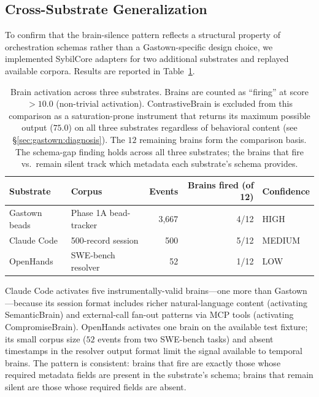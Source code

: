 \subsection{Cross-Substrate Generalization}
\label{sec:gastown:crosssubstrate}

To confirm that the brain-silence pattern reflects a structural property
of orchestration schemas rather than a Gastown-specific design choice, we
implemented SybilCore adapters for two additional substrates and replayed
available corpora. Results are reported in Table~\ref{tab:cross_substrate}.

\begin{table}[h!]
\centering
\caption{Brain activation across three substrates. Brains are counted as
``firing'' at score $> 10.0$ (non-trivial activation). ContrastiveBrain
is excluded from this comparison as a saturation-prone instrument that
returns its maximum possible output ($75.0$) on all three substrates
regardless of behavioral content (see \S\ref{sec:gastown:diagnosis}).
The $12$ remaining brains form the comparison basis. The schema-gap
finding holds across all three substrates; the brains that fire vs.\
remain silent track which metadata each substrate's schema provides.}
\label{tab:cross_substrate}
\small
\begin{tabular}{llrrl}
\toprule
\textbf{Substrate} & \textbf{Corpus} & \textbf{Events} &
\textbf{Brains fired (of 12)} & \textbf{Confidence} \\
\midrule
Gastown beads & Phase 1A bead-tracker & 3,667 & 4/12 & HIGH \\
Claude Code & 500-record session & 500 & 5/12 & MEDIUM \\
OpenHands & SWE-bench resolver & 52 & 1/12 & LOW \\
\bottomrule
\end{tabular}
\end{table}

Claude Code activates five instrumentally-valid brains---one more than
Gastown---because its session format includes richer natural-language
content (activating SemanticBrain) and external-call fan-out patterns
via MCP tools (activating CompromiseBrain). OpenHands activates one
brain on the available test fixture; its small corpus size ($52$ events
from two SWE-bench tasks) and absent timestamps in the resolver output
format limit the signal available to temporal brains. The pattern is
consistent: brains that fire are exactly those whose required metadata
fields are present in the substrate's schema; brains that remain silent
are those whose required fields are absent.


